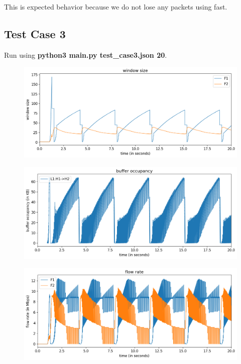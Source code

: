 \documentclass{article}
\begin{document}
This is expected behavior because we do not lose any packets using fast.



\subsection{Test Case 3} 

Run using \textbf{python3 main.py test\_case3.json 20}.

\begin{figure}[H]
\centering
\includegraphics[width = \textwidth]{test_case3 window size.png}
\end{figure}

\begin{figure}[H]
\centering
\includegraphics[width = \textwidth]{test_case3 buffer occupancy.png}
\end{figure}

\begin{figure}[H]
\centering
\includegraphics[width = \textwidth]{test_case3 flow rate.png}
\end{figure}
\end{document}
